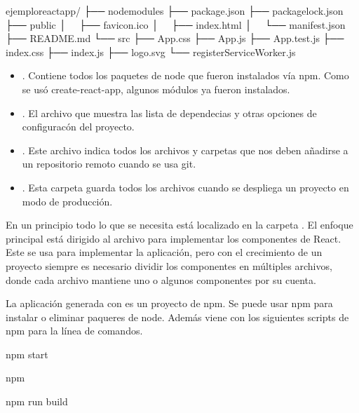 %
\begin{sphinxVerbatim}[commandchars=\\\{\}]
ejemplo\PYGZus{}react\PYGZus{}app/
├── node\PYGZus{}modules
├── package.json
├── package\PYGZhy{}lock.json
├── public
│   ├── favicon.ico
│   ├── index.html
│   └── manifest.json
├── README.md
└── src
    ├── App.css
    ├── App.js
    ├── App.test.js
    ├── index.css
    ├── index.js
    ├── logo.svg
    └── registerServiceWorker.js
\end{sphinxVerbatim}
\begin{itemize}
\item {} 
. Contiene todos los paquetes de node que fueron instalados vía npm. Como se usó create-react-app, algunos módulos ya fueron instalados.

\item {} 
. El archivo que muestra las lista de dependecias y otras opciones de configuracón del proyecto.

\item {} 
. Este archivo indica todos los archivos y carpetas que nos deben añadirse a un repositorio remoto cuando se usa git.

\item {} 
. Esta carpeta guarda todos los archivos cuando se despliega un proyecto en modo de producción.

\end{itemize}

En un principio todo lo que se necesita está localizado en la carpeta .
El enfoque principal está dirigido al archivo  para implementar los
componentes de React. Este se usa para implementar la aplicación, pero con el
crecimiento de un proyecto siempre es necesario dividir los componentes en
múltiples archivos, donde cada archivo mantiene uno o algunos componentes por
su cuenta.

La aplicación generada con  es un proyecto de npm. Se puede usar
npm para instalar o eliminar paqueres de node. Además viene con los siguientes
scripts de npm para la línea de comandos.

%
\begin{sphinxVerbatim}[commandchars=\\\{\}]
npm start

npm 

npm run build
\end{sphinxVerbatim}


